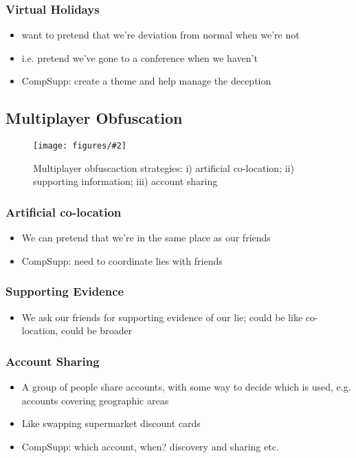 \documentclass{IOS-Book-Article}     %
\newcommand{\fig}[3][0.9]{
\begin{figure}[tp]
\begin{center}
\texttt{[image: figures/\#2]}
\caption{#3}
\label{fig:#2}
\end{center}
\end{figure}
}
\begin{document}
\subsubsection{Virtual Holidays}
\begin{itemize}
  \item want to pretend that we're deviation from normal when we're not
  \item i.e. pretend we've gone to a conference when we haven't
  \item CompSupp: create a theme and help manage the deception
\end{itemize}

\subsection{Multiplayer Obfuscation}
\fig{MultiPlayerObfuscation}{Multiplayer obfuscaction strategies: i) artificial
co-location; ii) supporting information; iii) account sharing}

\subsubsection{Artificial co-location}
\begin{itemize}
  \item We can pretend that we're in the same place as our friends
  \item CompSupp: need to coordinate lies with friends
\end{itemize}

\subsubsection{Supporting Evidence}
\begin{itemize}
  \item We ask our friends for supporting evidence of our lie; could be like
  co-location, could be broader
\end{itemize}

\subsubsection{Account Sharing}
\begin{itemize}
  \item A group of people share accounts, with some way to decide which is
  used, e.g. accounts covering geographic areas
  \item Like swapping supermarket discount cards
  \item CompSupp: which account, when? discovery and sharing etc.
\end{itemize}
\end{document}
